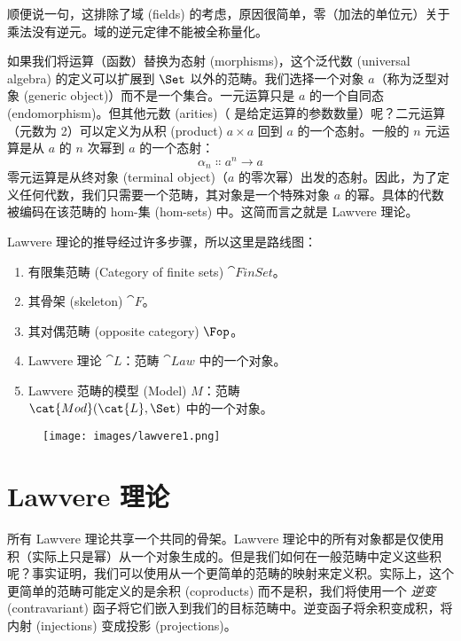 顺便说一句，这排除了域 (fields) 的考虑，原因很简单，零（加法的单位元）关于乘法没有逆元。域的逆元定律不能被全称量化。

如果我们将运算（函数）替换为态射 (morphisms)，这个泛代数 (universal algebra) 的定义可以扩展到 $\Set$ 以外的范畴。我们选择一个对象 $a$（称为泛型对象 (generic object)）而不是一个集合。一元运算只是 $a$ 的一个自同态 (endomorphism)。但其他元数 (arities)（ 是给定运算的参数数量）呢？二元运算（元数为 2）可以定义为从积 (product) $a\times{}a$ 回到 $a$ 的一个态射。一般的 $n$ 元运算是从 $a$ 的 $n$ 次幂到 $a$ 的一个态射：
\[\alpha_n \Colon a^n \to a\]
零元运算是从终对象 (terminal object)（$a$ 的零次幂）出发的态射。因此，为了定义任何代数，我们只需要一个范畴，其对象是一个特殊对象 $a$ 的幂。具体的代数被编码在该范畴的 hom-集 (hom-sets) 中。这简而言之就是 Lawvere 理论。

Lawvere 理论的推导经过许多步骤，所以这里是路线图：

\begin{enumerate}
  \tightlist
  \item
        有限集范畴 (Category of finite sets) $\cat{FinSet}$。
  \item
        其骨架 (skeleton) $\cat{F}$。
  \item
        其对偶范畴 (opposite category) $\Fop$。
  \item
        Lawvere 理论 $\cat{L}$：范畴 $\cat{Law}$ 中的一个对象。
  \item
        Lawvere 范畴的模型 (Model) $M$：范畴\\
        $\cat{Mod}(\cat{L}, \Set)$ 中的一个对象。
\end{enumerate}

\begin{figure}[H]
  \centering
  \texttt{[image: images/lawvere1.png]}
\end{figure}

\section{Lawvere 理论}

所有 Lawvere 理论共享一个共同的骨架。Lawvere 理论中的所有对象都是仅使用积（实际上只是幂）从一个对象生成的。但是我们如何在一般范畴中定义这些积呢？事实证明，我们可以使用从一个更简单的范畴的映射来定义积。实际上，这个更简单的范畴可能定义的是余积 (coproducts) 而不是积，我们将使用一个 \emph{逆变} (contravariant) 函子将它们嵌入到我们的目标范畴中。逆变函子将余积变成积，将内射 (injections) 变成投影 (projections)。

